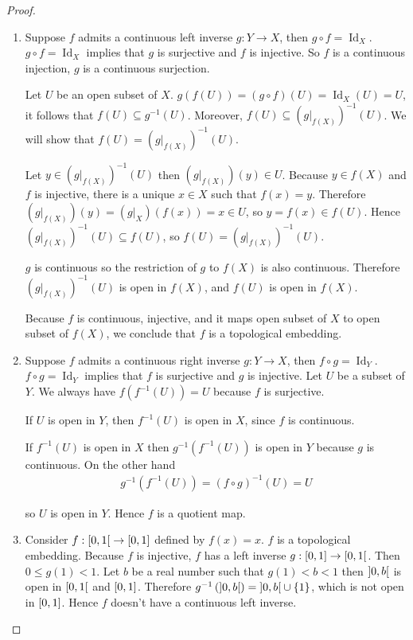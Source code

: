 \begin{proof}
    \begin{enumerate}[label={(\alph*)}]
        \item Suppose $f$ admits a continuous left inverse $g: Y \to X$, then $g\circ f = \operatorname{Id}_{X}$. $g\circ f = \operatorname{Id}_{X}$ implies that $g$ is surjective and $f$ is injective. So $f$ is a continuous injection, $g$ is a continuous surjection.

              Let $U$ be an open subset of $X$. $g(f(U)) = (g\circ f)(U) = \operatorname{Id}_{X}(U) = U$, it follows that $f(U) \subseteq g^{-1}(U)$. Moreover, $f(U) \subseteq {(g\vert_{f(X)})}^{-1}(U)$. We will show that $f(U) = {(g\vert_{f(X)})}^{-1}(U)$.

              Let $y\in {(g\vert_{f(X)})}^{-1}(U)$ then $(g\vert_{f(X)})(y) \in U$. Because $y\in f(X)$ and $f$ is injective, there is a unique $x\in X$ such that $f(x) = y$. Therefore $(g\vert_{f(X)})(y) = (g\vert_{X})(f(x)) = x \in U$, so $y = f(x) \in f(U)$. Hence ${(g\vert_{f(X)})}^{-1}(U) \subseteq f(U)$, so $f(U) = {(g\vert_{f(X)})}^{-1}(U)$.

              $g$ is continuous so the restriction of $g$ to $f(X)$ is also continuous. Therefore ${(g\vert_{f(X)})}^{-1}(U)$ is open in $f(X)$, and $f(U)$ is open in $f(X)$.

              Because $f$ is continuous, injective, and it maps open subset of $X$ to open subset of $f(X)$, we conclude that $f$ is a topological embedding.
        \item Suppose $f$ admits a continuous right inverse $g: Y\to X$, then $f\circ g = \operatorname{Id}_{Y}$. $f\circ g = \operatorname{Id}_{Y}$ implies that $f$ is surjective and $g$ is injective. Let $U$ be a subset of $Y$. We always have $f(f^{-1}(U)) = U$ because $f$ is surjective.

              If $U$ is open in $Y$, then $f^{-1}(U)$ is open in $X$, since $f$ is continuous.

              If $f^{-1}(U)$ is open in $X$ then $g^{-1}(f^{-1}(U))$ is open in $Y$ because $g$ is continuous. On the other hand
              \begin{align*}
                  g^{-1}(f^{-1}(U)) = {(f \circ g)}^{-1}(U) = U
              \end{align*}

              so $U$ is open in $Y$. Hence $f$ is a quotient map.
        \item Consider $f: \left[{0, 1}\right[ \to \left[{0, 1}\right]$ defined by $f(x) = x$. $f$ is a topological embedding. Because $f$ is injective, $f$ has a left inverse $g: \left[{0, 1}\right] \to \left[{0, 1}\right[$. Then $0\leq g(1) < 1$. Let $b$ be a real number such that $g(1) < b < 1$ then $\left]{0, b}\right[$ is open in $\left[{0, 1}\right[$ and $\left[{0, 1}\right]$. Therefore $g^{-1}\left(\left]{0, b}\right[\right) = \left]{0, b}\right[ \cup \{ 1 \}$, which is not open in $\left[{0, 1}\right]$. Hence $f$ doesn't have a continuous left inverse.


\end{enumerate}
\end{proof}
